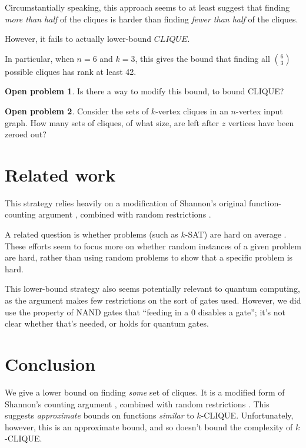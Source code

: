 \documentclass[12pt]{article}
\theoremstyle{definition}
\newtheorem{prob}{Open problem}[section]
\begin{document}
Circumstantially speaking, this approach seems to at least suggest
that finding {\em more than half} of the cliques is harder than finding
{\em fewer than half} of the cliques.

However, it fails to actually lower-bound $CLIQUE$.





In particular, when $n=6$ and $k=3$, this gives the bound that
finding all $6 \choose 3$ possible cliques has rank at least
42.

\begin{prob}
\label{lpRepair}
Is there a way to modify this bound, to bound CLIQUE?
\end{prob}


\begin{prob}
\label{vertexZonkingCount}
Consider the sets of $k$-vertex cliques in an $n$-vertex input graph.
How many sets of cliques, of what size,
are left after $z$ vertices have been zeroed out?
\end{prob}


\section{Related work}

This strategy relies heavily on a modification of Shannon's original
function-counting argument \cite{shannon_synthesis_1949},
combined with random restrictions
\cite{subbotovskaya1963comparison}\cite{hastad1987lower}.

A related question is whether problems
(such as $k$-SAT) are
hard on average \cite{bogdanov2006average}.
These efforts seem to focus more on whether
random
instances of a given problem are hard, rather
than using random problems to show that
a specific problem is hard.

This lower-bound strategy also seems potentially
relevant to quantum computing,
as the argument makes few restrictions on the sort of gates used.
However, we did use the property of NAND gates that ``feeding in
a 0 disables a gate''; it's not clear whether that's needed,
or holds for quantum gates.

\section{Conclusion}

We give a lower bound on finding {\em some} set of cliques.
It is a modified form of Shannon's counting argument
\cite{shannon_synthesis_1949}, combined with random restrictions
\cite{subbotovskaya1963comparison} \cite{hastad1987lower}.
This suggests {\em approximate} bounds on functions {\em similar} to $k$-CLIQUE.
Unfortunately, however, this is an approximate bound,
and so doesn't bound the complexity of $k$-CLIQUE.
\end{document}
